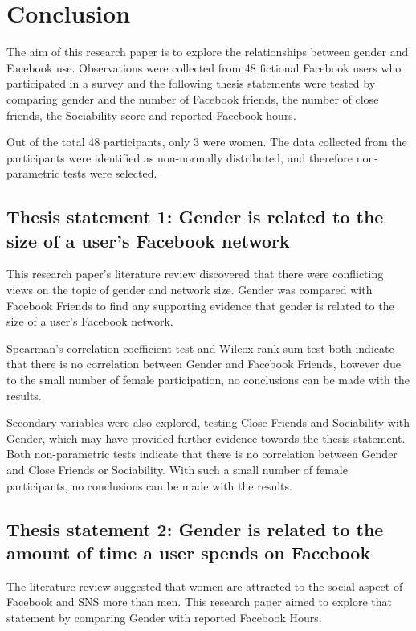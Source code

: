 \section{Conclusion}

The aim of this research paper is to explore the relationships between gender and Facebook use. Observations were collected from 48 fictional Facebook users who participated in a survey and the following thesis statements were tested by comparing gender and the number of Facebook friends, the number of close friends, the Sociability score and reported Facebook hours. 

Out of the total 48 participants, only 3 were women. The data collected from the participants were identified as non-normally distributed, and therefore non-parametric tests were selected. 

\subsection{Thesis statement 1: Gender is related to the size of a user's Facebook network}

This research paper's literature review discovered that there were conflicting views on the topic of gender and network size. Gender was compared with Facebook Friends to find any supporting evidence that gender is related to the size of a user's Facebook network.

Spearman's correlation coefficient test and Wilcox rank sum test both indicate that there is no correlation between Gender and Facebook Friends, however due to the small number of female participation, no conclusions can be made with the results.

Secondary variables were also explored, testing Close Friends and Sociability with Gender, which may have provided further evidence towards the thesis statement. Both non-parametric tests indicate that there is no correlation between Gender and Close Friends or Sociability. With such a small number of female participants, no conclusions can be made with the results.

\subsection{Thesis statement 2: Gender is related to the amount of time a user spends on Facebook}

The literature review suggested that women are attracted to the social aspect of Facebook and SNS more than men. This research paper aimed to explore that statement by comparing Gender with reported Facebook Hours.


